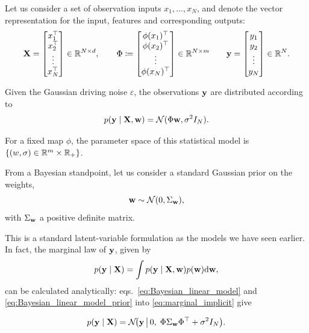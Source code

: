 Let us consider a set of observation inputs $x_1,\ldots,x_N$, and denote the vector representation for the input, features and corresponding outputs: 
\[
{ \mathbf{X}}=\begin{bmatrix}
x_1^\top\\
x_2^\top\\
\vdots\\
x_N^\top
\end{bmatrix} \in{\mathbb R}^{N\times d},
\qquad
\Phi \coloneqq
\begin{bmatrix}
\phi(x_1)^\top\\
\phi(x_2)^\top\\
\vdots\\
\phi(x_N)^\top
\end{bmatrix}\in\mathbb{R}^{N\times m}
\qquad
{ \mathbf{y}}=\begin{bmatrix}
y_1\\
y_2\\
\vdots\\
y_N
\end{bmatrix} \in{\mathbb R}^{N}.
\]

Given the Gaussian driving noise $\varepsilon$, the observations ${ \mathbf{y}}$ are distributed according to 
\begin{equation}
    p({ \mathbf{y}}\mid { \mathbf{X}},{ \mathbf{w}}) = {\mathcal N}(\Phi{ \mathbf{w}},\sigma^2I_N).
    \label{eq:Bayesian_linear_model}
\end{equation}


\begin{remark}
    For a fixed map $\phi$, the parameter space of this statistical model is $\{(w,\sigma) \in{\mathbb R}^m\times{\mathbb R}_+\}$.
\end{remark}


From a Bayesian standpoint, let us consider a standard Gaussian prior on the weights,
\begin{equation}
{ \mathbf{w}} \sim \mathcal{N}(0,\Sigma_{ \mathbf{w}}),
 \label{eq:Bayesian_linear_model_prior}
\end{equation}
with $\Sigma_{ \mathbf{w}}$ a positive definite matrix.

This is a standard latent-variable formulation as the models we have seen earlier. In fact, the marginal law of ${ \mathbf{y}}$, given by 
\begin{equation}
    p({ \mathbf{y}} \mid { \mathbf{X}}) = \int  p({ \mathbf{y}} \mid { \mathbf{X}}, { \mathbf{w}})p({ \mathbf{w}}){\text{d}}{ \mathbf{w}},
    \label{eq:marginal_implicit}
\end{equation}
can be calculated analytically: eqs.~\eqref{eq:Bayesian_linear_model} and  \eqref{eq:Bayesian_linear_model_prior} into  \eqref{eq:marginal_implicit} give

\[
p({ \mathbf{y}}\mid { \mathbf{X}})
= \mathcal N\!\bigl({ \mathbf{y}} \,\big|\, 0,\; \Phi\Sigma_{{ \mathbf{w}}}\Phi^\top+\sigma^2 I_N\bigr).
\]



